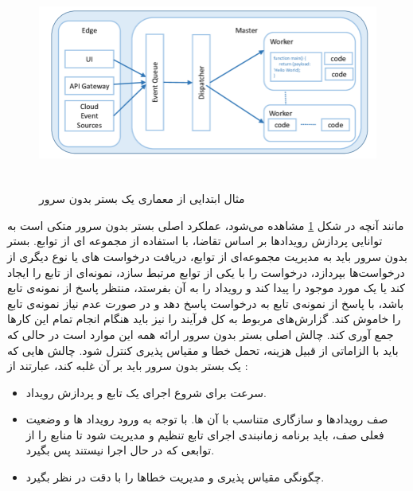 \begin{figure}[!h]
	\centering
	\includegraphics[height=7cm]{images/Serverless-platform-architecture}
	\caption{مثال ابتدایی از معماری یک بستر بدون سرور}
	\label{ServerlessPlatformArchitecture}
\end{figure}

مانند آنچه در شکل \ref{ServerlessPlatformArchitecture} مشاهده می‌شود، عملکرد اصلی بستر بدون سرور متکی است به توانایی پردازش رویدادها بر اساس تقاضا، با استفاده از مجموعه ای از توابع. بستر بدون سرور باید به مدیریت مجموعه‌ای از توابع، دریافت درخواست های  یا نوع دیگری از درخواست‌ها بپردازد، درخواست را با یکی از توابع مرتبط سازد، نمونه‌ای از تابع را ایجاد کند یا یک مورد موجود را پیدا کند و رویداد را به آن بفرستد، منتظر پاسخ از نمونه‌ی تابع باشد، با پاسخ از نمونه‌ی تابع به درخواست  پاسخ دهد و در صورت عدم نیاز نمونه‌ی تابع را خاموش کند. گزارش‌های مربوط به کل فرآیند را نیز باید هنگام انجام تمام این کارها جمع آوری کند. چالش اصلی بستر بدون سرور ارائه همه این موارد است در حالی که باید با الزاماتی از قبیل هزینه، تحمل خطا و مقیاس پذیری کنترل شود. چالش هایی که یک بستر بدون سرور باید بر آن غلبه کند، عبارتند از
\cite{pinto_dias_ferreira_2018}
\cite{baldini_2017}
:

\begin{itemize}
	
	\item سرعت برای شروع اجرای یک تابع و پردازش رویداد.
	
	\item صف رویدادها و سازگاری متناسب با آن ها. با توجه به ورود رویداد ها و وضعیت فعلی صف، باید برنامه زمانبندی اجرای تابع تنظیم و مدیریت شود تا منابع را از توابعی که در حال اجرا نیستند پس بگیرد.
	
	\item چگونگی مقیاس پذیری و مدیریت خطاها را با دقت در نظر بگیرد.
	
\end{itemize}

